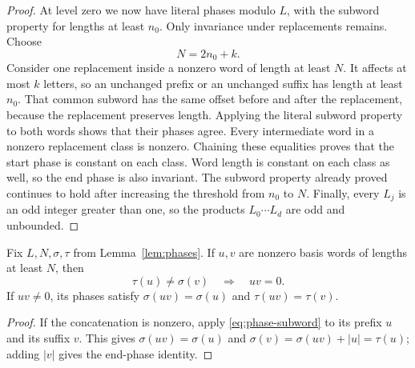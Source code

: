 \begin{proof}
At level zero we now have literal phases modulo $L$, with the subword
property for lengths at least $n_0$.  Only invariance under
replacements remains.  Choose
\[
 N=2n_0+k.
\]
Consider one replacement inside a nonzero word of length at least
$N$.  It affects at most $k$ letters, so an unchanged prefix or an
unchanged suffix has length at least $n_0$.  That common subword has
the same offset before and after the replacement, because the
replacement preserves length.  Applying the literal subword property
to both words shows that their phases agree.  Every intermediate
word in a nonzero replacement class is nonzero.  Chaining these
equalities proves that the start phase is constant on each class.
Word length is constant on each class as well, so the end phase is
also invariant.  The subword property
already proved continues to hold after increasing the threshold from
$n_0$ to $N$.  Finally, every $L_j$ is an odd integer greater than one,
so the products $L_0\cdots L_d$ are odd and unbounded.
\end{proof}

\begin{corollary}\label{cor:phase-products}
Fix $L,N,\sigma,\tau$ from Lemma~\ref{lem:phases}.  If $u,v$ are
nonzero basis words of lengths at least $N$, then
\[
 \tau(u)\ne\sigma(v)\quad\Longrightarrow\quad uv=0.
\]
If $uv\ne0$, its phases satisfy
$\sigma(uv)=\sigma(u)$ and $\tau(uv)=\tau(v)$.
\end{corollary}

\begin{proof}
If the concatenation is nonzero, apply
\eqref{eq:phase-subword} to its prefix $u$ and its suffix $v$.  This
gives $\sigma(uv)=\sigma(u)$ and
$\sigma(v)=\sigma(uv)+|u|=\tau(u)$; adding $|v|$ gives the end-phase
identity.
\end{proof}
